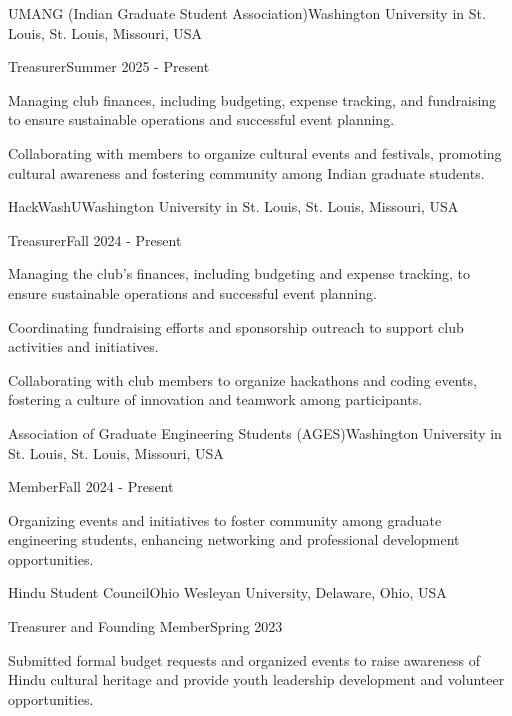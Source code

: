 \begin{leadershipentry}{UMANG (Indian Graduate Student Association)}{Washington University in St. Louis, St. Louis, Missouri, USA}
    \begin{positionentry}{Treasurer}{Summer 2025 - Present}
        \item Managing club finances, including budgeting, expense tracking, and fundraising to ensure sustainable operations and successful event planning.
        \item Collaborating with members to organize cultural events and festivals, promoting cultural awareness and fostering community among Indian graduate students.
    \end{positionentry}
\end{leadershipentry}

\begin{leadershipentry}{HackWashU}{Washington University in St. Louis, St. Louis, Missouri, USA}
    \begin{positionentry}{Treasurer}{Fall 2024 - Present}
        \item Managing the club's finances, including budgeting and expense tracking, to ensure sustainable operations and successful event planning.
        \item Coordinating fundraising efforts and sponsorship outreach to support club activities and initiatives.
        \item Collaborating with club members to organize hackathons and coding events, fostering a culture of innovation and teamwork among participants.
    \end{positionentry}
\end{leadershipentry}

\begin{leadershipentry}{Association of Graduate Engineering Students (AGES)}{Washington University in St. Louis, St. Louis, Missouri, USA}
    \begin{positionentry}{Member}{Fall 2024 - Present}
        \item Organizing events and initiatives to foster community among graduate engineering students, enhancing networking and professional development opportunities.
    \end{positionentry}
\end{leadershipentry}

\begin{leadershipentry}{Hindu Student Council}{Ohio Wesleyan University, Delaware, Ohio, USA}
    \begin{positionentry}{Treasurer and Founding Member}{Spring 2023}
        \item Submitted formal budget requests and organized events to raise awareness of Hindu cultural heritage and provide youth leadership development and volunteer opportunities.
    \end{positionentry}
\end{leadershipentry}

